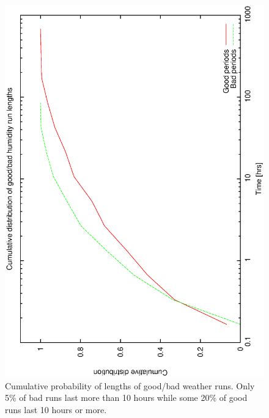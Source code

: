 \begin{figure}[htbp] 
\begin{center}
    \includegraphics[scale=0.4, angle=-90]{figures/ecs/good_bad_cumhum_bin.eps}
\end{center}
\caption[Cumulative probability of lengths of good/bad weather runs.]
{Cumulative probability of lengths of good/bad weather runs. Only 5\% of bad runs last more than 10 hours while some 20\% of good runs last 10 hours or more.}
\label{fig:good_bad_cumhum_dist}
\end{figure}


